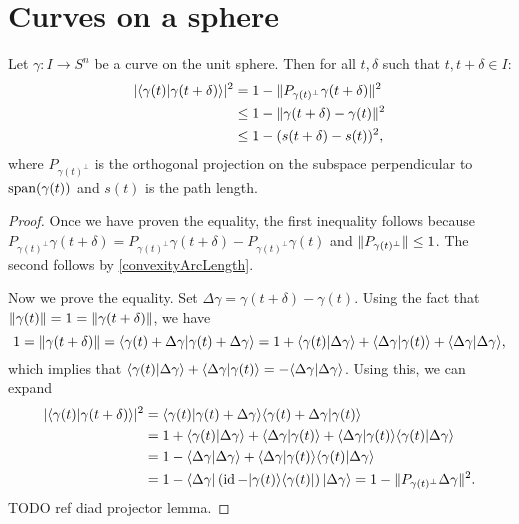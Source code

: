 \section{Curves on a sphere}
\begin{proposition}
Let $\gamma: I \to S^n$ be a curve on the unit sphere. Then for all $t, \delta$ such that $t,t+\delta\in I$:
\begin{align*}
|\inner{\gamma(t)| \gamma(t+\delta)}|^2 &= 1 - \norm{P_{\gamma(t)^\perp}\gamma(t+\delta)}^2 \\
&\leq 1 - \norm{\gamma(t+\delta) - \gamma(t)}^2 \\
&\leq 1 - (s(t+\delta)-s(t))^2,
\end{align*}
where $P_{\gamma(t)^\perp}$ is the orthogonal projection on the subspace perpendicular to $\operatorname{span}(\gamma(t))$ and $s(t)$ is the path length.
\end{proposition}
\begin{proof}
Once we have proven the equality, the first inequality follows because $P_{\gamma(t)^\perp}\gamma(t+\delta) = P_{\gamma(t)^\perp}\gamma(t+\delta) -  P_{\gamma(t)^\perp}\gamma(t)$ and $\lVert P_{\gamma(t)^\perp}\rVert \leq 1$. The second follows by \ref{convexityArcLength}.

Now we prove the equality. Set $\Delta \gamma = \gamma(t+\delta) - \gamma(t)$. Using the fact that $\lVert\gamma(t)\rVert = 1 = \lVert\gamma(t+\delta)\rVert$, we have
\[ 1 = \norm{\gamma(t+\delta)} = \inner{\gamma(t) + \Delta\gamma| \gamma(t) + \Delta\gamma} = 1 + \inner{\gamma(t)| \Delta\gamma} + \inner{\Delta \gamma| \gamma(t)} + \inner{\Delta \gamma| \Delta \gamma}, \]
which implies that $\inner{\gamma(t)| \Delta\gamma} + \inner{\Delta \gamma| \gamma(t)} = - \inner{\Delta \gamma| \Delta \gamma}$.
Using this, we can expand
\begin{align*}
|\inner{\gamma(t)| \gamma(t+\delta)}|^2 &= \inner{\gamma(t)| \gamma(t)+\Delta \gamma}\inner{\gamma(t)+\Delta \gamma| \gamma(t)} \\
&= 1 + \inner{\gamma(t)| \Delta\gamma} + \inner{\Delta \gamma| \gamma(t)} + \inner{\Delta \gamma| \gamma(t)}\inner{\gamma(t)| \Delta \gamma} \\
&= 1 - \inner{\Delta \gamma| \Delta \gamma} + \inner{\Delta \gamma| \gamma(t)}\inner{\gamma(t)| \Delta \gamma} \\
&= 1 - \bra{\Delta\gamma}(\id - \ketbra{\gamma(t)}{\gamma(t)})\ket{\Delta \gamma} = 1 - \norm{P_{\gamma(t)^\perp}\Delta\gamma}^2.
\end{align*}
TODO ref diad projector lemma.
\end{proof}

